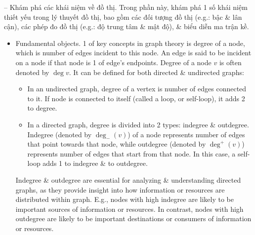 \documentclass{article}
\begin{document}
\begin{itemize}
\begin{itemize}
        -- {\sf Khám phá các khái niệm về đồ thị.} Trong phần này, khám phá 1 số khái niệm thiết yếu trong lý thuyết đồ thị, bao gồm các đối tượng đồ thị (e.g.: bậc \& lân cận), các phép đo đồ thị (e.g.: độ trung tâm \& mật độ), \& biểu diễn ma trận kề.
        \begin{itemize}
            \item {\sf Fundamental objects.} 1 of key concepts in graph theory is degree of a node, which is number of edges incident to this node. An edge is said to be incident on a node if that node is 1 of edge's endpoints. Degree of a node $v$ is often denoted by $\deg v$. It can be defined for both directed \& undirected graphs:
            \begin{itemize}
                \item In an undirected graph, degree of a vertex is number of edges connected to it. If node is connected to itself (called a loop, or self-loop), it adds 2 to degree.
                \item In a directed graph, degree is divided into 2 types: indegree \& outdegree. Indegree (denoted by $\deg_-(v)$) of a node represents number of edges that point towards that node, while outdegree (denoted by $\deg^+(v)$) represents number of edges that start from that node. In this case, a self-loop adds 1 to indegree \& to outdegree.
            \end{itemize}
            Indegree \& outdegree are essential for analyzing \& understanding directed graphs, as they provide insight into how information or resources are distributed within graph. E.g., nodes with high indegree are likely to be important sources of information or resources. In contrast, nodes with high outdegree are likely to be important destinations or consumers of information or resources.


\end{itemize}
\end{itemize}
\end{itemize}
\end{document}
